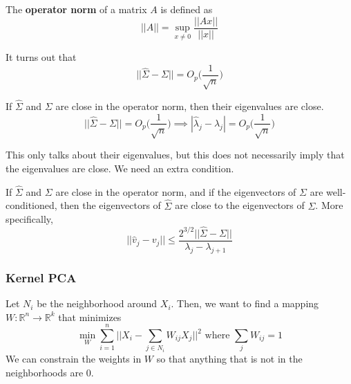 \documentclass{article}
\begin{document}
    \begin{definition}
      The \textbf{operator norm} of a matrix $A$ is defined as 
      \begin{equation}
        ||A|| = \sup_{x \neq 0} \frac{||Ax||}{||x||} 
      \end{equation}
    \end{definition}

    \begin{lemma}[]
      It turns out that 
      \begin{equation}
        ||\hat{\Sigma} - \Sigma|| = O_p \bigg( \frac{1}{\sqrt{n}} \bigg)
      \end{equation}
    \end{lemma}

    \begin{theorem}
      If $\hat{\Sigma}$ and $\Sigma$ are close in the operator norm, then their eigenvalues are close. 
      \begin{equation}
        ||\hat{\Sigma} - \Sigma|| = O_p \bigg( \frac{1}{\sqrt{n}} \bigg) \implies |\hat{\lambda}_j - \lambda_j| = O_p \bigg( \frac{1}{\sqrt{n}} \bigg) 
      \end{equation}
    \end{theorem}

    This only talks about their eigenvalues, but this does not necessarily imply that the eigenvalues are close. We need an extra condition. 

    \begin{theorem}
      If $\hat{\Sigma}$ and $\Sigma$ are close in the operator norm, and if the eigenvectors of $\Sigma$ are well-conditioned, then the eigenvectors of $\hat{\Sigma}$ are close to the eigenvectors of $\Sigma$. More specifically, 
      \begin{equation}
        ||\hat{v}_j - v_j|| \leq \frac{2^{3/2} ||\hat{\Sigma} - \Sigma||}{\lambda_j - \lambda_{j+1}}
      \end{equation}
    \end{theorem}

    \subsubsection{Kernel PCA}

      \begin{definition}
        Let $N_i$ be the neighborhood around $X_i$. Then, we want to find a mapping $W: \mathbb{R}^n \rightarrow \mathbb{R}^k$ that minimizes 
        \begin{equation}
          \min_{W} \sum_{i=1}^n \bigg| \bigg| X_i - \sum_{j \in N_i} W_{ij} X_j \bigg| \bigg|^2 \text{ where } \sum_{j} W_{ij} = 1
        \end{equation}
        We can constrain the weights in $W$ so that anything that is not in the neighborhoods are $0$. 
      \end{definition}
\end{document}
